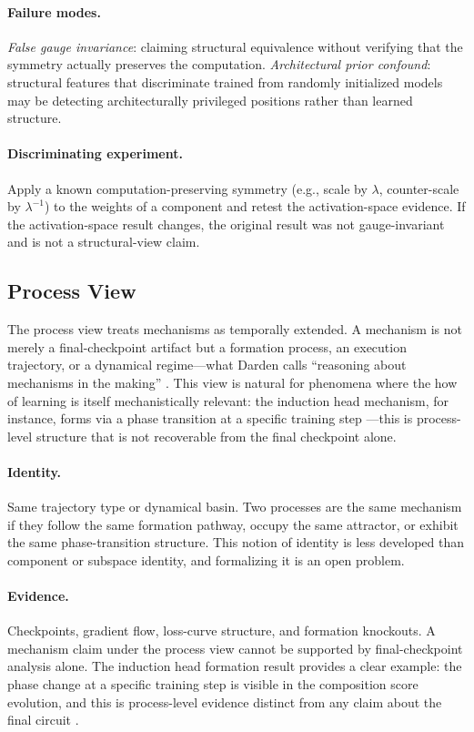 \documentclass[11pt]{article}
\theoremstyle{remark}
\begin{document}
\paragraph{Failure modes.}
\emph{False gauge invariance}: claiming structural equivalence without
verifying that the symmetry actually preserves the computation.
\emph{Architectural prior confound}: structural features that
discriminate trained from randomly initialized models may be detecting
architecturally privileged positions rather than learned structure.

\paragraph{Discriminating experiment.}
Apply a known computation-preserving symmetry (e.g., scale by $\lambda$,
counter-scale by $\lambda^{-1}$) to the weights of a component and
retest the activation-space evidence.  If the activation-space result
changes, the original result was not gauge-invariant and is not a
structural-view claim.

\subsection{Process View}

The process view treats mechanisms as temporally extended.  A mechanism
is not merely a final-checkpoint artifact but a formation process, an
execution trajectory, or a dynamical regime---what Darden calls
``reasoning about mechanisms in the making'' \citep{darden2006}.  This
view is natural for phenomena where the how of learning is itself
mechanistically relevant:
the induction head mechanism, for instance, forms via a phase transition
at a specific training step \citep{olsson2022}---this is process-level
structure that is not recoverable from the final checkpoint alone.

\paragraph{Identity.}
Same trajectory type or dynamical basin.  Two processes are the same
mechanism if they follow the same formation pathway, occupy the same
attractor, or exhibit the same phase-transition structure.  This notion
of identity is less developed than component or subspace identity, and
formalizing it is an open problem.

\paragraph{Evidence.}
Checkpoints, gradient flow, loss-curve structure, and formation knockouts.
A mechanism claim under the process view cannot be supported by
final-checkpoint analysis alone.  The induction head formation result
provides a clear example: the phase change at a specific training step
is visible in the composition score evolution, and this is process-level
evidence distinct from any claim about the final circuit \citep{olsson2022}.
\end{document}
